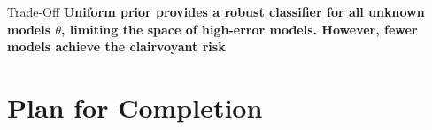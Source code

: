 \documentclass[aspectratio=169,usenames,dvipsnames]{beamer}
\begin{document}
\begin{frame}
\begin{columns}[c]
\begin{column}{.5\linewidth}
\end{column}

\end{columns}

\begin{block}{Trade-Off}
\textbf{Uniform prior provides a robust classifier for all unknown models $\theta$, limiting the space of high-error models. However, fewer models achieve the clairvoyant risk}
\end{block}


\end{frame}






\section{Plan for Completion}
\end{document}
